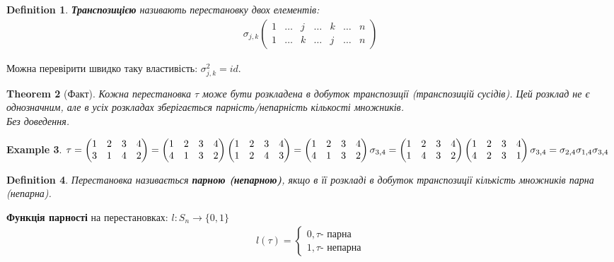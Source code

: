 \documentclass[a4paper, 10pt]{article}
\theoremstyle{theoremdd}
\newtheorem{theorem}{Theorem}[subsection]
\newtheorem{definition}[theorem]{Definition}
\newtheorem{example}[theorem]{Example}
\begin{document}
	\begin{definition}
	\textbf{Транспозицією} називають перестановку двох елементів:
	\begin{align*}
	\sigma_{j,k} \begin{pmatrix}
	1 & \dots & j & \dots & k & \dots & n \\
	1 & \dots & k & \dots & j & \dots & n
	\end{pmatrix}
	\end{align*}
	\end{definition}
	Можна перевірити швидко таку властивість: $\sigma_{j,k}^2 = id$.
	
	\begin{theorem}[Факт]
	Кожна перестановка $\tau$ може бути розкладена в добуток транспозиції (транспозицій сусідів). Цей розклад не є однозначним, але в усіх розкладах зберігається парність/непарність кількості множників.\\
	\textit{Без доведення.}
	\end{theorem}
	
	\begin{example}
	$\tau = \begin{pmatrix}
	1 & 2 & 3 & 4 \\
	3 & 1 & 4 & 2
	\end{pmatrix} = \begin{pmatrix}
	1 & 2 & 3 & 4 \\
	4 & 1 & 3 & 2
	\end{pmatrix} \begin{pmatrix}
	1 & 2 & 3 & 4 \\
	1 & 2 & 4 & 3
	\end{pmatrix} = \begin{pmatrix}
	1 & 2 & 3 & 4 \\
	4 & 1 & 3 & 2
	\end{pmatrix} \sigma_{3,4} \\ = \begin{pmatrix}
	1 & 2 & 3 & 4 \\
	1 & 4 & 3 & 2
	\end{pmatrix} \begin{pmatrix}
	1 & 2 & 3 & 4 \\
	4 & 2 & 3 & 1
	\end{pmatrix} \sigma_{3,4} = \sigma_{2,4}\sigma_{1,4}\sigma_{3,4}$
	\end{example}

		
	\begin{definition}
	Перестановка називається \textbf{парною (непарною)}, якщо в її розкладі в добуток транспозиції кількість множників парна (непарна).
	\end{definition}
	\textbf{Функція парності} на перестановках: $l: S_n \to \{0,1\}$
	\begin{align*}
	l(\tau) = \begin{cases} 0, \tau \textrm{- парна} \\ 1, \tau \textrm{- непарна} \end{cases}
	\end{align*}
	
\end{document}
